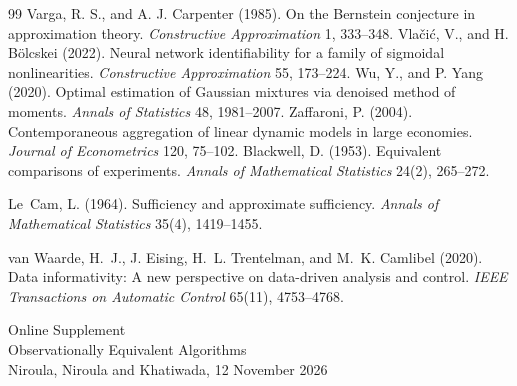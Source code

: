 \documentclass[12pt]{article}
\theoremstyle{definition}
\theoremstyle{remark}
\begin{document}
\begin{thebibliography}{99}
 Varga, R. S., and A. J. Carpenter (1985). On the Bernstein conjecture in approximation theory. \emph{Constructive Approximation} 1, 333--348.
 Vla\v{c}i\'c, V., and H. B\"olcskei (2022). Neural network identifiability for a family of sigmoidal nonlinearities. \emph{Constructive Approximation} 55, 173--224.
 Wu, Y., and P. Yang (2020). Optimal estimation of Gaussian mixtures via denoised method of moments. \emph{Annals of Statistics} 48, 1981--2007.
 Zaffaroni, P. (2004). Contemporaneous aggregation of linear dynamic models in large economies. \emph{Journal of Econometrics} 120, 75--102.
 Blackwell, D. (1953). Equivalent comparisons of experiments. \emph{Annals of Mathematical Statistics} 24(2), 265--272.

 Le~Cam, L. (1964). Sufficiency and approximate sufficiency. \emph{Annals of Mathematical Statistics} 35(4), 1419--1455.

 van Waarde, H.~J., J. Eising, H.~L. Trentelman, and M.~K. Camlibel (2020). Data informativity: A new perspective on data-driven analysis and control. \emph{IEEE Transactions on Automatic Control} 65(11), 4753--4768.

\end{thebibliography}
\appendix
\clearpage
\singlespacing\small\sloppy
\renewcommand{\topfraction}{0.9}\renewcommand{\bottomfraction}{0.8}\renewcommand{\textfraction}{0.07}\renewcommand{\floatpagefraction}{0.75}
\setcounter{page}{1}\setcounter{table}{0}\setcounter{figure}{0}
\begin{center}{\Large Online Supplement}\\[4pt]{\large Observationally Equivalent Algorithms}\\[2pt]{\normalsize Niroula, Niroula and Khatiwada, 12 November 2026}\end{center}
\end{document}

